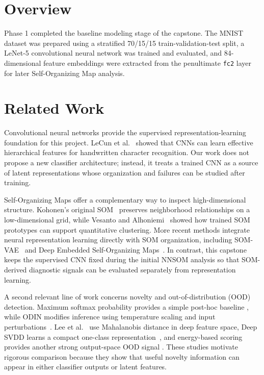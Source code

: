 \documentclass[11pt]{article}
\begin{document}
\setcounter{page}{2}

\section{Overview}

Phase 1 completed the baseline modeling stage of the capstone. The MNIST
dataset was prepared using a stratified 70/15/15 train-validation-test
split, a LeNet-5 convolutional neural network was trained and evaluated,
and 84-dimensional feature embeddings were extracted from the
penultimate \texttt{fc2} layer for later Self-Organizing Map analysis.

\section{Related Work}

Convolutional neural networks provide the supervised representation-learning
foundation for this project. LeCun et al.~\cite{lecun1998gradient} showed that
CNNs can learn effective hierarchical features for handwritten character
recognition. Our work does not propose a new classifier architecture; instead,
it treats a trained CNN as a source of latent representations whose organization
and failures can be studied after training.

Self-Organizing Maps offer a complementary way to inspect high-dimensional
structure. Kohonen's original SOM~\cite{kohonen1990som} preserves neighborhood
relationships on a low-dimensional grid, while Vesanto and
Alhoniemi~\cite{vesanto2000clustering} showed how trained SOM prototypes can
support quantitative clustering. More recent methods integrate neural
representation learning directly with SOM organization, including
SOM-VAE~\cite{fortuin2019somvae} and Deep Embedded Self-Organizing
Maps~\cite{forest2021desom}. In contrast, this capstone keeps the supervised
CNN fixed during the initial NNSOM analysis so that SOM-derived diagnostic
signals can be evaluated separately from representation learning.

A second relevant line of work concerns novelty and out-of-distribution (OOD)
detection. Maximum softmax probability provides a simple post-hoc baseline
\cite{hendrycks2017baseline}, while ODIN modifies inference using temperature
scaling and input perturbations~\cite{liang2018odin}. Lee et
al.~\cite{lee2018mahalanobis} use Mahalanobis distance in deep feature space,
Deep SVDD learns a compact one-class representation~\cite{ruff2018deep}, and
energy-based scoring provides another strong output-space OOD signal
\cite{liu2020energy}.
These studies motivate rigorous comparison because they
show that useful novelty information can appear in either classifier outputs
or latent features.
\end{document}
